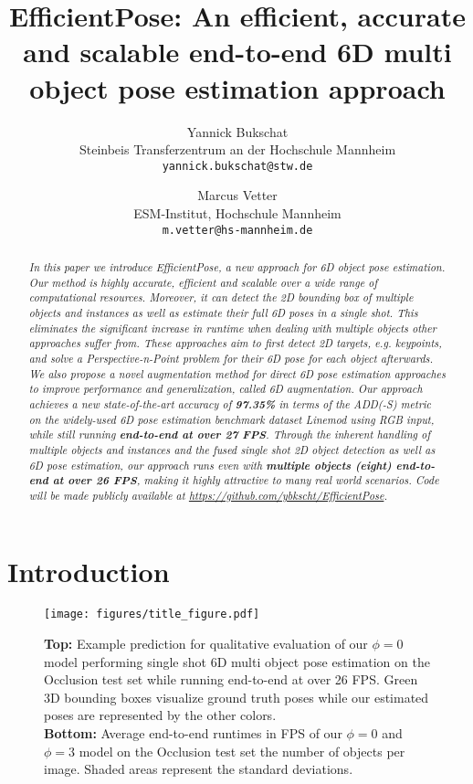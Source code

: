 \documentclass[twocolumn, 10pt, letterpaper]{article}
\title{\bf EfficientPose: An efficient, accurate and scalable end-to-end 6D multi object pose estimation approach}
\author{Yannick Bukschat\\
				\small{Steinbeis Transferzentrum an der Hochschule Mannheim}\\
				\texttt{\small yannick.bukschat@stw.de}
				\and
				Marcus Vetter\\
				\small{ESM-Institut, Hochschule Mannheim}\\
				\texttt{\small m.vetter@hs-mannheim.de}
}
\begin{document}
\maketitle

\begin{abstract}
\textit{In this paper we introduce EfficientPose, a new approach for 6D object pose estimation. Our method is highly accurate, efficient and scalable over a wide range of computational resources. Moreover, it can detect the 2D bounding box of multiple objects and instances as well as estimate their full 6D poses in a single shot. This eliminates the significant increase in runtime when dealing with multiple objects other approaches suffer from. These approaches aim to first detect 2D targets, e.g. keypoints, and solve a Perspective-n-Point problem for their 6D pose for each object afterwards. We also propose a novel augmentation method for direct 6D pose estimation approaches to improve performance and generalization, called 6D augmentation. Our approach achieves a new state-of-the-art accuracy of \textbf{97.35\%} in terms of the ADD(-S) metric on the widely-used 6D pose estimation benchmark dataset Linemod using RGB input, while still running \textbf{end-to-end at over 27 FPS}. Through the inherent handling of multiple objects and instances and the fused single shot 2D object detection as well as 6D pose estimation, our approach runs even with \textbf{multiple objects (eight) end-to-end at over 26 FPS}, making it highly attractive to many real world scenarios. Code will be made publicly available at {\small \url{https://github.com/ybkscht/EfficientPose}}.}
\end{abstract}

\section{Introduction}
\label{section_introduction}

\begin{figure}
\centering
\texttt{[image: figures/title\_figure.pdf]}
\caption{\textbf{Top:} Example prediction for qualitative evaluation of our $\phi = 0$ model performing single shot 6D multi object pose estimation on the Occlusion test set while running end-to-end at over 26 FPS. Green 3D bounding boxes visualize ground truth poses while our estimated poses are represented by the other colors.\\
\textbf{Bottom:} Average end-to-end runtimes in FPS of our $\phi = 0$ and $\phi = 3$ model on the Occlusion test set \wrt the number of objects per image. Shaded areas represent the standard deviations.}
\label{figure_title}
\end{figure}
\end{document}

